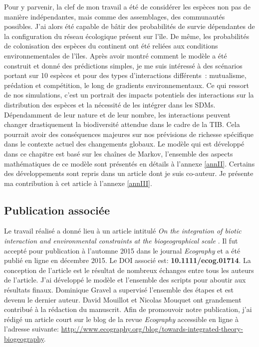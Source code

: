 Pour y parvenir, la clef de mon travail a été de considérer les espèces non pas de manière indépendantes, mais comme des assemblages, des communautés possibles.
J'ai alors été capable de bâtir des probabilités de survie dépendantes de la configuration du réseau écologique présent sur l'île.
De même, les probabilités de colonisation des espèces du continent ont été reliées aux conditions environnementales de l'îles.
Après avoir montré comment le modèle a été construit et donné des prédictions simples, je me suis intéressé à des scénarios portant sur
10 espèces et pour des types d'interactions différents~: mutualisme, prédation et compétition, le long de gradients environnementaux.
Ce qui ressort de nos simulations, c'est un portrait des impacts potentiels des interactions sur la distribution des espèces et la nécessité de les intégrer dans les SDMs.
Dépendamment de leur nature et de leur nombre, les interactions peuvent changer drastiquement la biodiversité attendue dans le cadre de la TIB.
Cela pourrait avoir des conséquences majeures sur nos prévisions de richesse spécifique dans le contexte actuel des changements globaux.
Le modèle qui est développé dans ce chapitre est basé sur les chaînes de Markov, l'ensemble des aspects mathématiques de ce modèle sont présentés en détails à l'annexe \ref{annII}. Certains des développements sont repris dans un article dont je suis co-auteur. Je présente ma contribution à cet article à l'annexe \ref{annIII}.



\subsection{Publication associée}

Le travail réalisé a donné lieu à un article intitulé
\emph{On the integration of biotic interaction and environmental constraints at the biogeographical scale}
\citep{Cazelles2016a}. Il fut accepté pour publication à l'automne 2015 dans le
journal \emph{Ecography} et a été publié en ligne en décembre 2015.
Le DOI associé est: \textbf{10.1111/ecog.01714}.
La conception de l'article est le résultat de nombreux échanges entre tous les auteurs de l'article.
J'ai développé le modèle et l'ensemble des scripts pour aboutir aux résultats finaux.
Dominique Gravel a supervisé l'ensemble des étapes et est devenu le dernier auteur.
David Mouillot et Nicolas Mouquet ont grandement contribué à la rédaction du manuscrit.
Afin de promouvoir notre publication, j'ai rédigé un article court sur le blog de la revue \emph{Ecography} accessible en ligne à l'adresse suivante:
\url{http://www.ecography.org/blog/towards-integrated-theory-biogeography}.


